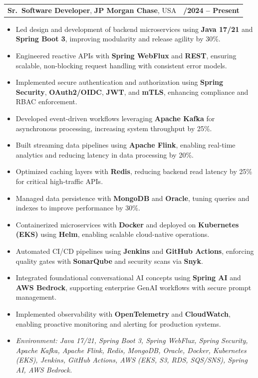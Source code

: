 \documentclass[letterpaper,11pt]{article}
\makeatletter
\newcommand{\resumeItem}[1]{
  \item\footnotesize{
    {#1 \vspace{-2pt}}
  }
}
\newcommand{\resumeSubheading}[4]{
  \vspace{-2pt}\item
    \begin{tabular*}{1.0\textwidth}[t]{l@{\extracolsep{\fill}}r}
      \textbf{\fontsize{10pt}{14pt}\selectfont #3}, \textbf{\fontsize{10pt}{14pt}\selectfont #1}, \fontsize{10pt}{14pt}\selectfont #4 & \textbf{\fontsize{10pt}{14pt}\selectfont #2} \\
    \end{tabular*}\vspace{-7pt}
}
\newcommand{\resumeItemListStart}{\begin{itemize}[leftmargin=*]}
\newcommand{\resumeItemListEnd}{\end{itemize}\vspace{-5pt}}
\makeatother
\begin{document}
\resumeSubheading
{JP Morgan Chase}{09/2024 -- Present}
{Sr.\ Software Developer}{USA}
\resumeItemListStart
  \resumeItem{Led design and development of backend microservices using \textbf{Java 17/21} and \textbf{Spring Boot 3}, improving modularity and release agility by 30\%.}
  \resumeItem{Engineered reactive APIs with \textbf{Spring WebFlux} and \textbf{REST}, ensuring scalable, non-blocking request handling with consistent error models.}
  \resumeItem{Implemented secure authentication and authorization using \textbf{Spring Security}, \textbf{OAuth2/OIDC}, \textbf{JWT}, and \textbf{mTLS}, enhancing compliance and RBAC enforcement.}
  \resumeItem{Developed event-driven workflows leveraging \textbf{Apache Kafka} for asynchronous processing, increasing system throughput by 25\%.}
  \resumeItem{Built streaming data pipelines using \textbf{Apache Flink}, enabling real-time analytics and reducing latency in data processing by 20\%.}
  \resumeItem{Optimized caching layers with \textbf{Redis}, reducing backend read latency by 25\% for critical high-traffic APIs.}
  \resumeItem{Managed data persistence with \textbf{MongoDB} and \textbf{Oracle}, tuning queries and indexes to improve performance by 30\%.}
  \resumeItem{Containerized microservices with \textbf{Docker} and deployed on \textbf{Kubernetes (EKS)} using \textbf{Helm}, enabling scalable cloud-native operations.}
  \resumeItem{Automated CI/CD pipelines using \textbf{Jenkins} and \textbf{GitHub Actions}, enforcing quality gates with \textbf{SonarQube} and security scans via \textbf{Snyk}.}
  \resumeItem{Integrated foundational conversational AI concepts using \textbf{Spring AI} and \textbf{AWS Bedrock}, supporting enterprise GenAI workflows with secure prompt management.}
  \resumeItem{Implemented observability with \textbf{OpenTelemetry} and \textbf{CloudWatch}, enabling proactive monitoring and alerting for production systems.}
  \resumeItem{\textit{Environment: Java 17/21, Spring Boot 3, Spring WebFlux, Spring Security, Apache Kafka, Apache Flink, Redis, MongoDB, Oracle, Docker, Kubernetes (EKS), Jenkins, GitHub Actions, AWS (EKS, S3, RDS, SQS/SNS), Spring AI, AWS Bedrock.}}
\resumeItemListEnd
\end{document}

